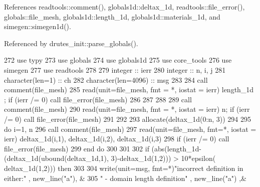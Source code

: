 References readtools\+::comment(), globals1d\+::deltax\+\_\+1d, readtools\+::file\+\_\+error(), globals\+::file\+\_\+mesh, globals1d\+::length\+\_\+1d, globals1d\+::materials\+\_\+1d, and simegen\+::simegen1d().



Referenced by drutes\+\_\+init\+::parse\+\_\+globals().


\begin{DoxyCode}
272       \textcolor{keywordtype}{use }typy
273       \textcolor{keywordtype}{use }globals
274       \textcolor{keywordtype}{use }globals1d
275       \textcolor{keywordtype}{use }core_tools
276       \textcolor{keywordtype}{use }simegen
277       \textcolor{keywordtype}{use }readtools
278 
279       \textcolor{keywordtype}{integer} :: ierr
280       \textcolor{keywordtype}{integer} :: n, i, j
281       \textcolor{keywordtype}{character(len=1)} :: ch
282       \textcolor{keywordtype}{character(len=4096)} :: msg
283 
284       \textcolor{keyword}{call }comment(file_mesh)
285       \textcolor{keyword}{read}(unit=file_mesh, fmt = *, iostat = ierr) length_1d ; \textcolor{keywordflow}{if} (ierr \textcolor{comment}{/= 0) }\textcolor{keyword}{call }
      file_error\textcolor{comment}{(file_mesh)}
286 \textcolor{comment}{}
287 \textcolor{comment}{}
288 \textcolor{comment}{}
289 \textcolor{comment}{      }\textcolor{keyword}{call }comment(file_mesh)
290       \textcolor{keyword}{read}(unit=file_mesh, fmt = *, iostat = ierr) n; \textcolor{keywordflow}{if} (ierr /= 0) \textcolor{keyword}{call }
      file_error\textcolor{comment}{(file_mesh)}
291 \textcolor{comment}{}
292 \textcolor{comment}{}
293 \textcolor{comment}{      }\textcolor{keyword}{allocate}(deltax_1d(0:n, 3))
294 
295       \textcolor{keywordflow}{do} i=1, n
296         \textcolor{keyword}{call }comment(file_mesh)
297         \textcolor{keyword}{read}(unit=file_mesh, fmt=*, iostat = ierr) deltax_1d(i,1), deltax_1d(i,\textcolor{comment}{2), 
      deltax_1d(i,3)}
298 \textcolor{comment}{          }\textcolor{keywordflow}{if} (ierr /= 0) \textcolor{keyword}{call }file_error(file_mesh)
299 \textcolor{keywordflow}{      end do}
300       
301       
302      \textcolor{keywordflow}{if} (abs(length_1d-(deltax_1d(ubound(deltax_1d,1), 3)-deltax_1d(1,2)\textcolor{comment}{)) > 10*epsilon(
      deltax_1d(1,2))) }\textcolor{keywordflow}{then}
303 
304         \textcolor{keyword}{write}(unit=msg, fmt=*)\textcolor{stringliteral}{"incorrect definition in either:"} , new\_line\textcolor{comment}{(}\textcolor{stringliteral}{"a"}\textcolor{comment}{),  &}
305 \textcolor{comment}{        }\textcolor{stringliteral}{"                          - domain length definition"} ,  new\_line\textcolor{comment}{(}\textcolor{stringliteral}{"a"}\textcolor{comment}{) ,&}

\end{DoxyCode}

